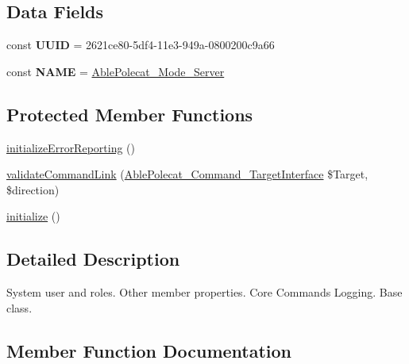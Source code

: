 \subsection*{Data Fields}
\begin{DoxyCompactItemize}
\item 
\hypertarget{class_able_polecat___mode___server_a74b892c8c0b86bf9d04c5819898c51e7}{}const {\bfseries U\+U\+I\+D} = \textquotesingle{}2621ce80-\/5df4-\/11e3-\/949a-\/0800200c9a66\textquotesingle{}\label{class_able_polecat___mode___server_a74b892c8c0b86bf9d04c5819898c51e7}

\item 
\hypertarget{class_able_polecat___mode___server_a244352f035b82b20b0efa506167fd862}{}const {\bfseries N\+A\+M\+E} = \textquotesingle{}\hyperlink{class_able_polecat___mode___server}{Able\+Polecat\+\_\+\+Mode\+\_\+\+Server}\textquotesingle{}\label{class_able_polecat___mode___server_a244352f035b82b20b0efa506167fd862}

\end{DoxyCompactItemize}
\subsection*{Protected Member Functions}
\begin{DoxyCompactItemize}
\item 
\hyperlink{class_able_polecat___mode___server_a1edabbfbec5258ee9df5fc2f236f51b4}{initialize\+Error\+Reporting} ()
\item 
\hyperlink{class_able_polecat___mode___server_a37906da60d0165610266b97b07bc5267}{validate\+Command\+Link} (\hyperlink{interface_able_polecat___command___target_interface}{Able\+Polecat\+\_\+\+Command\+\_\+\+Target\+Interface} \$Target, \$direction)
\item 
\hyperlink{class_able_polecat___mode___server_a91098fa7d1917ce4833f284bbef12627}{initialize} ()
\end{DoxyCompactItemize}


\subsection{Detailed Description}
System user and roles. Other member properties. Core Commands Logging. Base class. 

\subsection{Member Function Documentation}
\hypertarget{class_able_polecat___mode___server_aa493f0ac5633a2902787572680d5a12a}{}
